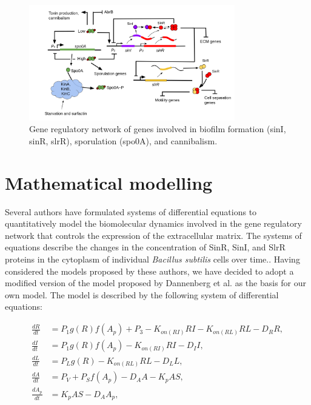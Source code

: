 \begin{figure}[h]
    \centering
    \includegraphics[width=0.8\textwidth]{figures/circuit.png}
    \caption{Gene regulatory network of genes involved in biofilm formation (sinI, sinR, slrR), sporulation (spo0A), and cannibalism.
    }
    \label{fig:circuit}
\end{figure}


\section{Mathematical modelling}\label{sec:litrev:theme2}
Several authors have formulated systems of differential equations to quantitatively model the biomolecular dynamics involved in the gene regulatory network that controls the expression of the extracellular matrix. The systems of equations describe the changes in the concentration of SinR, SinI, and SlrR proteins in the cytoplasm of individual \textit{Bacillus subtilis} cells over time.{\footnotesize\cite{simon}\cite{Voigt2005}\cite{Newman2013}\cite{Chen2023}\cite{Pedreira2021}\cite{Hallinan2010}}. Having considered the models proposed by these authors, we have decided to adopt a modified version of the model proposed by Dannenberg et al. {\footnotesize\cite{simon}} as the basis for our own model. The model is described by the following system of differential equations:

\begin{align}
\frac{dR}{dt} &= P_{1}g(R)f(A_p)+P_{3} - K_{on(RI)} R I - K_{on(RL)}RL  - D_{R} R, \label{eq:1} \\
\frac{dI}{dt} &= P_{1}g(R)f(A_p)  - K_{on(RI)} R I - D_{I} I, \label{eq:2} \\
\frac{dL}{dt} &= P_{L}g(R) - K_{on(RL)} RL - D_{L} L , \label{eq:3} \\
\frac{dA}{dt} &= P_V + P_S f(A_p) - D_A A - K_{p}A S , \label{eq:4} \\
\frac{dA_p}{dt} &= K_{p}A S - D_A A_p, \label{eq:5}
\end{align}


